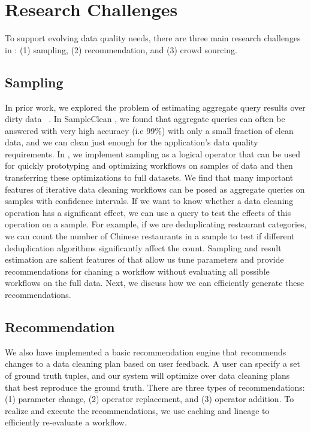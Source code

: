 \section{Research Challenges}
To support evolving data quality needs, there are three main research challenges in \sys: (1) sampling, (2) recommendation, and (3) crowd sourcing.

\subsection{Sampling}
In prior work, we explored the problem of estimating aggregate query results over dirty data ~\cite{wang1999sample, svc}.
In SampleClean \cite{wang1999sample}, we found that aggregate queries can often be answered with very high accuracy (i.e 99\%) with only a small fraction of clean data, and we can clean just enough for the application's data quality requirements.
In \sys, we implement sampling as a logical operator that can be used for quickly prototyping and optimizing workflows on samples of data and then transferring these optimizations to full datasets.
We find that many important features of iterative data cleaning workflows can be posed as aggregate queries on samples with confidence intervals.
If we want to know whether a data cleaning operation has a significant effect, we can use a query to test the effects of this operation on a sample.
For example, if we are deduplicating restaurant categories, we can count the number of Chinese restaurants in a sample to test if different deduplication algorithms significantly affect the count.
Sampling and result estimation are salient features of \sys that allow us tune parameters and provide recommendations for chaning a workflow without evaluating all possible workflows on the full data.
Next, we discuss how we can efficiently generate these recommendations.

\subsection{Recommendation}
We also have implemented a basic recommendation engine that recommends changes to a data cleaning plan based on user feedback. 
A user can specify a set of ground truth tuples, and our system will optimize over data cleaning plans that best reproduce the ground truth.
There are three types of recommendations: (1) parameter change, (2) operator replacement, and (3) operator addition.
To realize and execute the recommendations, we use caching and lineage to efficiently re-evaluate a workflow.

